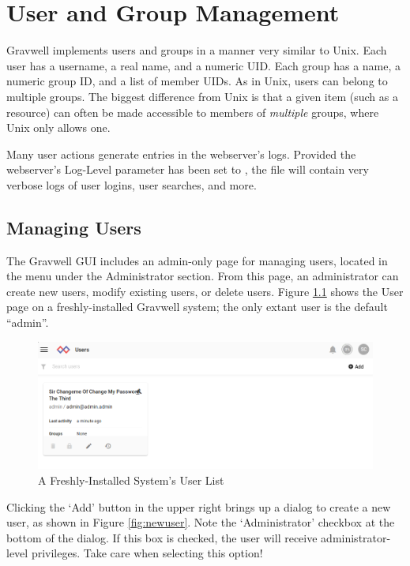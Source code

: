 \chapter{User and Group Management}

Gravwell implements users and groups in a manner very similar to Unix.
Each user has a username, a real name, and a numeric UID. Each group has
a name, a numeric group ID, and a list of member UIDs. As in Unix, users
can belong to multiple groups. The biggest difference from Unix is that
a given item (such as a resource) can often be made accessible to
members of \emph{multiple} groups, where Unix only allows one.

Many user actions generate entries in the webserver's logs. Provided
the webserver's Log-Level parameter has been set to , the
file  will contain very verbose logs
of user logins, user searches, and more.

\section{Managing Users}

The Gravwell GUI includes an admin-only page for managing users,
located in the menu under the Administrator section. From this page, an
administrator can create new users, modify existing users, or delete
users. Figure \ref{fig:fresh-users} shows the User page on a freshly-installed
Gravwell system; the only extant user is the default ``admin''.

\begin{figure}[H]
	\includegraphics{images/users-admin.png}
	\caption{A Freshly-Installed System's User List}
	\label{fig:fresh-users}
\end{figure}

Clicking the `Add' button in the upper right brings up a dialog to
create a new user, as shown in Figure \ref{fig:newuser}. Note the 
`Administrator' checkbox at the bottom of the dialog. If this
box is checked, the user will receive administrator-level privileges.
Take care when selecting this option!



